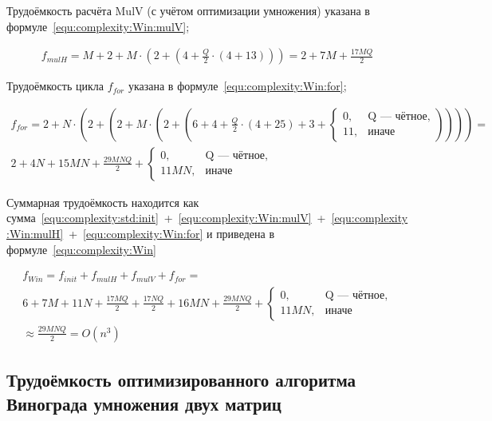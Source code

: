 Трудоёмкость расчёта MulV (с учётом оптимизации умножения) указана в формуле~\eqref{equ:complexity:Win:mulV};

\begin{equation}
	\label{equ:complexity:Win:mulV}
	\begin{gathered}
		f_{mulH} = M + 2 + M\cdot(2 + (4 + \frac{Q}{2} \cdot (4 + 13))) = 2 + 7M + \frac{17MQ}{2}
	\end{gathered}
\end{equation}

Трудоёмкость цикла $f_{for}$ указана в формуле~\eqref{equ:complexity:Win:for};

\begin{equation}
	\label{equ:complexity:Win:for}
	\begin{gathered}
		f_{for} = 2 + N\cdot (2 + (2 + M\cdot (2 + (6 + 4 + \frac{Q}{2}\cdot (4 + 25) + 3 +
		\begin{cases}
			0, & \text{Q --- чётное},\\
			11, & \text{иначе}
		\end{cases})))) = \\
		2 + 4N + 15MN + \frac{29MNQ}{2} +
		\begin{cases}
			0, & \text{Q --- чётное},\\
			11MN, & \text{иначе}
		\end{cases}
	\end{gathered}
\end{equation}

Суммарная трудоёмкость находится как сумма~\eqref{equ:complexity:std:init}~+~\eqref{equ:complexity:Win:mulV}~+~\eqref{equ:complexity:Win:mulH}~+~\eqref{equ:complexity:Win:for} и приведена в формуле~\eqref{equ:complexity:Win}

\begin{equation}
	\label{equ:complexity:Win}
	\begin{gathered}
		f_{Win} = f_{init} + f_{mulH} + f_{mulV} + f_{for} = \\
		6 + 7M + 11N + \frac{17MQ}{2} + \frac{17NQ}{2} + 16MN + \frac{29MNQ}{2} +
		\begin{cases}
			0, & \text{Q --- чётное},\\
			11MN, & \text{иначе}
		\end{cases} \\
		\approx \frac{29MNQ}{2} = O(n^3)
	\end{gathered}
\end{equation}
\clearpage

\subsection{Трудоёмкость оптимизированного алгоритма Винограда умножения двух матриц}

